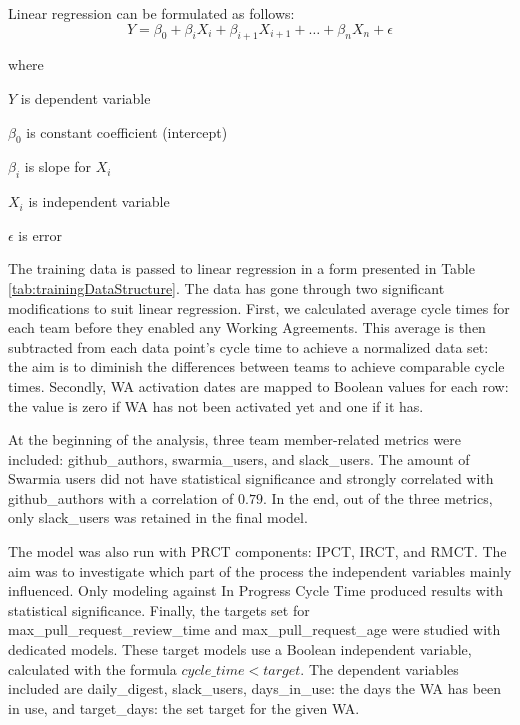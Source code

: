 \begin{samepage}

Linear regression can be formulated as follows:
\begin{equation}
Y = \beta_0 + \beta_i X_i + \beta_{i+1} X_{i+1} + \ldots + \beta_n X_n + \epsilon
\end{equation}

where
\begin{description}
\item $Y$ is dependent variable
\item $\beta_0$ is constant coefficient (intercept)
\item $\beta_i$ is slope for $X_i$
\item $X_i$ is independent variable
\item $\epsilon$ is error
\end{description}

\end{samepage}

The training data is passed to linear regression in a form presented in Table \ref{tab:trainingDataStructure}. The data has gone through two significant modifications to suit linear regression. First, we calculated average cycle times for each team before they enabled any Working Agreements. This average is then subtracted from each data point's cycle time to achieve a normalized data set: the aim is to diminish the differences between teams to achieve comparable cycle times. Secondly, WA activation dates are mapped to Boolean values for each row: the value is zero if WA has not been activated yet and one if it has.



At the beginning of the analysis, three team member-related metrics were included: github\_authors, swarmia\_users, and slack\_users. The amount of Swarmia users did not have statistical significance and strongly correlated with github\_authors with a correlation of $0.79$. In the end, out of the three metrics, only slack\_users was retained in the final model.

The model was also run with PRCT components: IPCT, IRCT, and RMCT. The aim was to investigate which part of the process the independent variables mainly influenced. Only modeling against In Progress Cycle Time produced results with statistical significance. Finally, the targets set for max\_pull\_request\_review\_time and max\_pull\_request\_age were studied with dedicated models. These target models use a Boolean independent variable, calculated with the formula $cycle\_time<target$. The dependent variables included are daily\_digest, slack\_users, days\_in\_use: the days the WA has been in use, and target\_days: the set target for the given WA. 

